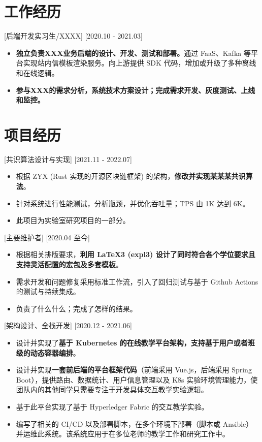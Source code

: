 \documentclass{resume}
\begin{document}
\section{工作经历}

[后端开发实习生/XXXX]
[2020.10 - 2021.03] 

\begin{itemize}
  \item \textbf{独立负责XXX业务后端的设计、开发、测试和部署。}通过 FaaS、Kafka 等平台实现站内信模板渲染服务。向上游提供 SDK 代码，增加或升级了多种离线和在线逻辑。
  \item \textbf{参与XXX的需求分析，系统技术方案设计；完成需求开发、灰度测试、上线和监控。}
\end{itemize}

\section{项目经历}

[共识算法设计与实现]
[2021.11 - 2022.07] 

\begin{itemize}
  \item 根据 ZYX (Rust 实现的开源区块链框架) 的架构，\textbf{修改并实现某某某共识算法}。
  \item 针对系统进行性能测试，分析瓶颈，并优化吞吐量；TPS 由 1K 达到 6K。
  \item 此项目为实验室研究项目的一部分。
\end{itemize}

[主要维护者]
[2020.04 至今]

\begin{itemize}
  \item 根据相关排版要求，\textbf{利用 LaTeX3 (expl3) 设计了同时符合各个学位要求且支持灵活配置的宏包及多套模板}。
  \item 需求开发和问题修复采用标准工作流，引入了回归测试与基于 Github Actions 的测试与持续集成。
  \item 负责了什么什么；完成了怎样的结果。
\end{itemize}


[架构设计、全栈开发]
[2020.12 - 2021.06] 

\begin{itemize}
  \item 设计并实现了\textbf{基于 Kubernetes 的在线教学平台架构，支持基于用户或者班级的动态容器编排}。
  \item 设计并实现\textbf{一套前后端的平台框架代码}（前端采用 Vue.js，后端采用 Spring Boot），提供路由、数据统计、用户信息管理以及 K8s 实验环境管理能力，使团队内的其他同学只需要专注于开发具体交互教学实验逻辑。
  \item 基于此平台实现了基于 Hyperledger Fabric 的交互教学实验。
  \item 编写了相关的 CI/CD 以及部署脚本，在多个环境下部署（脚本或 Ansible）并运维此系统。该系统应用于在多位老师的教学工作和研究工作中。
\end{itemize}
\end{document}
